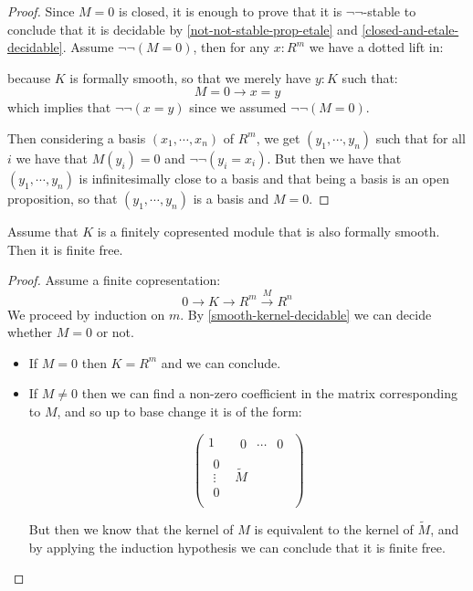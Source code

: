 \begin{proof}
Since $M=0$ is closed, it is enough to prove that it is $\neg\neg$-stable to conclude that it is decidable by \cref{not-not-stable-prop-etale} and \cref{closed-and-etale-decidable}. Assume $\neg\neg(M=0)$, then for any $x:R^m$ we have a dotted lift in:
 \begin{center}
\end{center}
because $K$ is formally smooth, so that we merely have $y:K$ such that: 
\[M=0\to x=y\]
which implies that $\neg\neg(x=y)$ since we assumed $\neg\neg(M=0)$.

Then considering a basis $(x_1,\cdots,x_n)$ of $R^m$, we get $(y_1,\cdots,y_n)$ such that for all $i$ we have that $M(y_i) = 0$ and $\neg\neg(y_i=x_i)$. But then we have that $(y_1,\cdots,y_n)$ is infinitesimally close to a basis and that being a basis is an open proposition, so that $(y_1,\cdots,y_n)$ is a basis and $M=0$.
\end{proof}

\begin{lemma}\label{smooth-corpresented-implies-free}
Assume that $K$ is a finitely copresented module that is also formally smooth. Then it is finite free.
\end{lemma}

\begin{proof}
Assume a finite copresentation:
\[0\to K\to R^m\overset{M}{\to} R^n\]
We proceed by induction on $m$. By \cref{smooth-kernel-decidable} we can decide whether $M=0$ or not.
\begin{itemize}
\item If $M=0$ then $K=R^m$ and we can conclude.
\item If $M\not=0$ then we can find a non-zero coefficient in the matrix corresponding to $M$, and so up to base change it is of the form:

\[
\begin{pmatrix}
1 & \begin{matrix}0&\cdots & 0\end{matrix}  \\
\begin{matrix}0\\ \vdots\\ 0\end{matrix} & \widetilde{M} \\
\end{pmatrix}
\]

But then we know that the kernel of $M$ is equivalent to the kernel of $\widetilde{M}$, and by applying the induction hypothesis we can conclude that it is finite free.
\end{itemize}
\end{proof}


